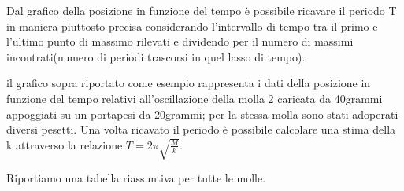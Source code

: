 \documentclass[a4paper]{article}
\theoremstyle{definition}
\begin{document}
	\noindent Dal grafico della posizione in funzione del tempo è possibile ricavare il periodo T in maniera piuttosto precisa considerando l'intervallo di tempo tra il primo e l'ultimo punto di massimo rilevati e dividendo per il numero di massimi incontrati(numero di periodi trascorsi in quel lasso di tempo).\\
	
	\begin{figure}[!htbp]
	\end{figure}
	il grafico sopra riportato come esempio rappresenta i dati della posizione in funzione del tempo relativi all'oscillazione della molla 2 caricata da 40grammi appoggiati su un portapesi da 20grammi; per la stessa molla sono stati adoperati diversi pesetti.
	Una volta ricavato il periodo è possibile calcolare una stima della k attraverso la relazione \(T = 2\pi\sqrt{\frac{M}{k}}\).
	
 \noindent Riportiamo una tabella riassuntiva per tutte le molle.
	
\end{document}
